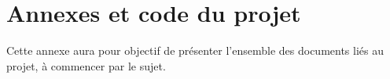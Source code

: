 \documentclass{report}
\begin{document}

\hypersetup{hidelinks}

\tableofcontents








\chapter{Annexes et code du projet}
Cette annexe aura pour objectif de présenter l'ensemble des documents liés au projet, à commencer par le sujet.
\end{document}
